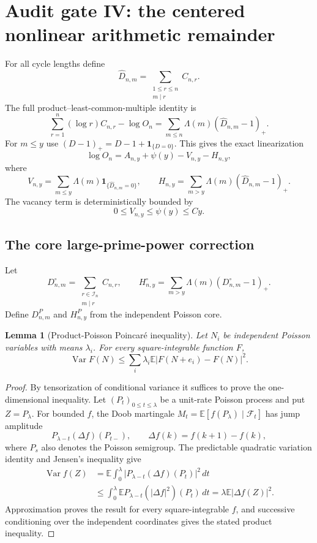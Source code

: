 \documentclass[11pt]{article}
\newtheorem{lemma}[theorem]{Lemma}
\theoremstyle{remark}
\newcommand{\Ee}{\mathbb E}
\newcommand{\Var}{\operatorname{Var}}
\newcommand{\one}{\mathbf 1}
\newcommand{\dd}{\,d}
\begin{document}
\section{Audit gate IV: the centered nonlinear arithmetic remainder}
\label{sec:remainder-gate}

For all cycle lengths define
\[
 \widehat D_{n,m}=\sum_{\substack{1\le r\le n\\m\mid r}}C_{n,r}.
\]
The full product--least-common-multiple identity is
\[
 \sum_{r=1}^n(\log r)C_{n,r}-\log O_n
 =\sum_{m\le n}\Lambda(m)(\widehat D_{n,m}-1)_+.
\]
For $m\le y$ use
$(D-1)_+=D-1+\one_{\{D=0\}}$.  This gives the exact linearization
\begin{equation}
\label{eq:exact-linearization} \log O_n=A_{n,y}+\psi(y)-V_{n,y}-H_{n,y},
\end{equation}
where
\[
 V_{n,y}=\sum_{m\le y}\Lambda(m)\one_{\{\widehat D_{n,m}=0\}},
 \qquad
 H_{n,y}=\sum_{m>y}\Lambda(m)(\widehat D_{n,m}-1)_+.
\]
The vacancy term is deterministically bounded by
\begin{equation}
\label{eq:vacancy-bound}
 0\le V_{n,y}\le\psi(y)\le Cy.
\end{equation}

\subsection{The core large-prime-power correction}

Let
\[
 D_{n,m}^\circ=\sum_{\substack{r\in\mathcal I_n\\m\mid r}}C_{n,r},
 \qquad
 H_{n,y}^\circ=\sum_{m>y}\Lambda(m)(D_{n,m}^\circ-1)_+.
\]
Define $D_{n,m}^P$ and $H_{n,y}^P$ from the independent Poisson core.

\begin{lemma}[Product-Poisson Poincar\'e inequality]
\label{lem:product-poisson-poincare}
Let $N_i$ be independent Poisson variables with means $\lambda_i$.  For
every square-integrable function $F$,
\[
 \Var F(N)\le\sum_i\lambda_i\Ee
 \bigl|F(N+e_i)-F(N)\bigr|^2.
\]
\end{lemma}

\begin{proof}
By tensorization of conditional variance it suffices to prove the
one-dimensional inequality.  Let $(P_t)_{0\le t\le\lambda}$ be a unit-rate
Poisson process and put $Z=P_\lambda$.  For bounded $f$, the Doob martingale
$M_t=\Ee[f(P_\lambda)\mid\mathcal F_t]$ has jump amplitude
\[
 P_{\lambda-t}(\Delta f)(P_{t-}),
 \qquad \Delta f(k)=f(k+1)-f(k),
\]
where $P_s$ also denotes the Poisson semigroup.  The predictable quadratic
variation identity and Jensen's inequality give
\begin{align*}
 \Var f(Z)
 &=\Ee\int_0^\lambda
   \bigl|P_{\lambda-t}(\Delta f)(P_t)\bigr|^2\dd t\\
 &\le\int_0^\lambda
   \Ee P_{\lambda-t}(|\Delta f|^2)(P_t)\dd t
 =\lambda\Ee|\Delta f(Z)|^2.
\end{align*}
Approximation proves the result for every square-integrable $f$, and
successive conditioning over the independent coordinates gives the stated
product inequality.
\end{proof}
\end{document}
